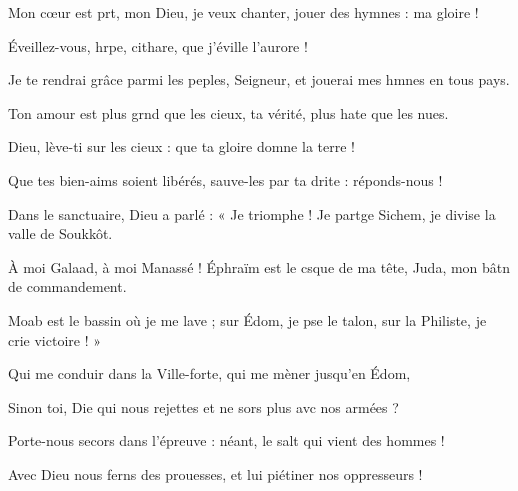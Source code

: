 \item Mon cœur est prt, mon Dieu,\psstar{} je veux chanter, jouer des hymnes :  ma gloire !
\item Éveillez-vous, hrpe, cithare,\psstar{} que j’éville l’aurore !
\item Je te rendrai grâce parmi les peples, Seigneur,\psstar{} et jouerai mes hmnes en tous pays.
\item Ton amour est plus grnd que les cieux,\psstar{} ta vérité, plus hate que les nues.
\item Dieu, lève-ti sur les cieux :\psstar{} que ta gloire domne la terre !
\item Que tes bien-aims soient libérés,\psstar{} sauve-les par ta drite : réponds-nous !
\item Dans le sanctuaire, Dieu a parlé :\pscross{} « Je triomphe ! Je partge Sichem,\psstar{} je divise la valle de Soukkôt.
\item À moi Galaad, à moi Manassé !\pscross{} Éphraïm est le csque de ma tête,\psstar{} Juda, mon bâtn de commandement.
\item Moab est le bassin où je me lave ;\pscross{} sur Édom, je pse le talon,\psstar{} sur la Philiste, je crie victoire ! »
\item Qui me conduir dans la Ville-forte,\psstar{} qui me mèner jusqu’en Édom,
\item Sinon toi, Die qui nous rejettes\psstar{} et ne sors plus avc nos armées ?
\item Porte-nous secors dans l’épreuve :\psstar{} néant, le salt qui vient des hommes !
\item Avec Dieu nous ferns des prouesses,\psstar{} et lui piétiner nos oppresseurs !